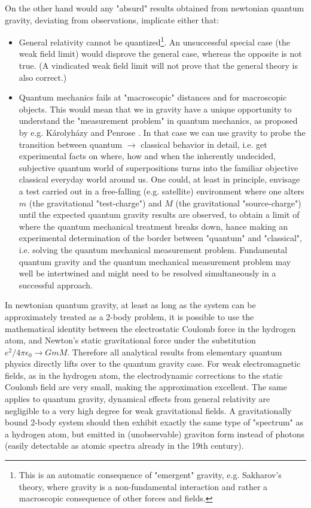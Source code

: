 	On the other hand would any "absurd" results obtained from	newtonian quantum gravity, deviating from observations, implicate	either that:
	\begin{itemize}
		\item General relativity cannot be quantized\footnote{This is an automatic consequence of "emergent" gravity, e.g. Sakharov's 	theory, where gravity is a non-fundamental interaction and rather a macroscopic consequence of other forces and fields.}. An unsuccessful special case (the weak field limit) would disprove the general case, whereas the opposite is not true. (A vindicated weak field limit will not prove that the general theory is also correct.)
	
		\item Quantum mechanics fails at "macroscopic" distances and for macroscopic objects. This would mean that we in gravity have a unique opportunity to understand the "measurement problem" in quantum mechanics, as proposed by e.g. K\'{a}rolyh\'{a}zy and Penrose \cite{Penrose}. In that case we can use gravity to probe the transition between quantum $\rightarrow$ classical behavior in detail, i.e. get experimental facts on where, how and when the inherently undecided, subjective quantum world of superpositions turns into the familiar objective classical everyday world around us. One could, at least in principle, envisage a test carried out in a free-falling (e.g.	satellite) environment where one alters $m$ (the gravitational "test-charge") and $M$ (the gravitational "source-charge") until	the expected quantum gravity results are observed, to obtain a limit of where the quantum mechanical treatment breaks down, hance	making an experimental determination of the border between "quantum" and "classical", i.e. solving the quantum mechanical measurement problem. Fundamental quantum gravity and the quantum mechanical measurement problem may well be intertwined and might need to be resolved simultaneously in a successful approach.
	\end{itemize}
	
	
	In newtonian quantum gravity, at least as long as the system can
	be approximately treated as a 2-body problem, it is possible to
	use the mathematical identity between the electrostatic Coulomb
	force in the hydrogen atom, and Newton's static gravitational
	force under the substitution $e^2 / 4 \pi \epsilon_0 \rightarrow
	GmM$. Therefore all analytical results from elementary quantum
	physics directly lifts over to the quantum gravity case. For weak
	electromagnetic fields, as in the hydrogen atom, the
	electrodynamic corrections to the static Coulomb field are very
	small, making the approximation excellent. The same applies to
	quantum gravity, dynamical effects from general relativity are
	negligible to a very high degree for weak gravitational fields. A
	gravitationally bound 2-body system should then exhibit exactly
	the same type of "spectrum" as a hydrogen atom, but emitted in
	(unobservable) graviton form instead of photons (easily detectable
	as atomic spectra already in the 19th century).
	
